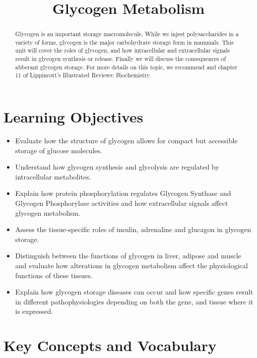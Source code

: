 \documentclass{tufte-handout}
\title{Glycogen Metabolism}
\author{}
\date{}  %
\begin{document}
\maketitle%

\begin{abstract}
\noindent Glycogen is an important storage macromolecule.  While we injest polysaccharides in a variety of forms, glycogen is the major carbohydrate storage form in mammals.  This unit will cover the roles of glycogen, and how intracellular and extracellular signals result in glycogen synthesis or release.  Finally we will discuss the consequences of abberant glycogen storage.  For more details on this topic, we recommend \citet{Bollen1998} and chapter 11 of Lippincott's Illustrated Reviews: Biochemistry\cite{Ferrier2017}.
\end{abstract}

\tableofcontents
\pagebreak
\section{Learning Objectives}

\begin{itemize}
\item Evaluate how the structure of glycogen allows for compact but accessible storage of glucose molecules.
\item Understand how glycogen synthesis and glycolysis are regulated by intracellular metabolites.
\item Explain how protein phosphorylation regulates Glycogen Synthase and Glycogen Phosphorylase activities and how extracellular signals affect glycogen metabolism.
\item Assess the tissue-specific roles of insulin, adrenaline and glucagon in glycogen storage.
\item Distinguish between the functions of glycogen in liver, adipose and muscle and evaluate how alterations in glycogen metabolism affect the physiological functions of these tissues.
\item Explain how glycogen storage diseases can occur and how specific genes result in different pathophysiologies depending on both the gene, and tissue where it is expressed.
\end{itemize}

\section{Key Concepts and Vocabulary}
\end{document}
